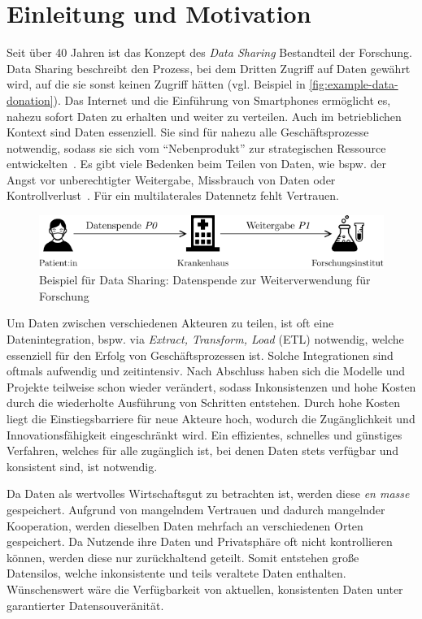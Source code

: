 
\section{Einleitung und Motivation}

Seit über 40 Jahren ist das Konzept des \emph{Data Sharing} Bestandteil der Forschung.
Data Sharing beschreibt den Prozess, bei dem Dritten Zugriff auf Daten gewährt wird, auf die sie sonst keinen Zugriff hätten (vgl. Beispiel in \autoref{fig:example-data-donation}).
Das Internet und die Einführung von Smartphones ermöglicht es, nahezu sofort Daten zu erhalten und weiter zu verteilen.
Auch im betrieblichen Kontext sind Daten essenziell.
Sie sind für nahezu alle Geschäftsprozesse notwendig, sodass sie sich vom \enquote{Nebenprodukt} zur strategischen Ressource entwickelten~\cite{mollerIndustrialDataEcosystems2024}.
Es gibt viele Bedenken beim Teilen von Daten, wie bspw. der Angst vor unberechtigter Weitergabe, Missbrauch von Daten oder Kontrollverlust~\cite{mollerIndustrialDataEcosystems2024}.
Für ein multilaterales Datennetz fehlt Vertrauen.

\begin{figure}
    \includegraphics[width=\textwidth]{./assets/example_horizontal.drawio.pdf}
    \caption{Beispiel für Data Sharing: Datenspende zur Weiterverwendung für Forschung}
    \label{fig:example-data-donation}
\end{figure}

Um Daten zwischen verschiedenen Akteuren zu teilen, ist oft eine Datenintegration, bspw. via \emph{Extract, Transform, Load} (ETL) notwendig, welche essenziell für den Erfolg von Geschäftsprozessen ist.
Solche Integrationen sind oftmals aufwendig und zeitintensiv.
Nach Abschluss haben sich die Modelle und Projekte teilweise schon wieder verändert, sodass Inkonsistenzen und hohe Kosten durch die wiederholte Ausführung von Schritten entstehen.
Durch hohe Kosten liegt die Einstiegsbarriere für neue Akteure hoch, wodurch die Zugänglichkeit und Innovationsfähigkeit eingeschränkt wird.
Ein effizientes, schnelles und günstiges Verfahren, welches für alle zugänglich ist, bei denen Daten stets verfügbar und konsistent sind, ist notwendig.

Da Daten als wertvolles Wirtschaftsgut zu betrachten ist, werden diese \emph{en masse} gespeichert.
Aufgrund von mangelndem Vertrauen und dadurch mangelnder Kooperation, werden dieselben Daten mehrfach an verschiedenen Orten gespeichert.
Da Nutzende ihre Daten und Privatsphäre oft nicht kontrollieren können, werden diese nur zurückhaltend geteilt.
Somit entstehen große Datensilos, welche inkonsistente und teils veraltete Daten enthalten.
Wünschenswert wäre die Verfügbarkeit von aktuellen, konsistenten Daten unter garantierter Datensouveränität.

